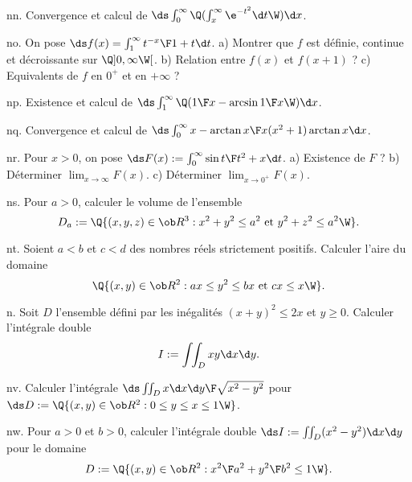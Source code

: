 \exo [Level=2,Fight=1,Learn=1,Type=\Exercices,Field=\IntégralesGénéralisées|\IntégralesMultiples,Origin=] nn. 
Convergence et calcul de $\ds \int_0^\infty\Q(\int_x^\infty\e^{-t^2}\d t\W)\d x$. 

\exo [Level=2,Fight=1,Learn=1,Type=\Exercices,Field=\FonctionsDéfiniesParUneIntégrale,Origin=] no. 
On pose $\ds f(x)=\int_1^\infty{t^{-x}\F1+t}\d t$. \pn 
a) Montrer que $f$ est définie, continue et décroissante sur $\Q]0,\infty\W[$. \pn
b) Relation entre $f(x)$ et $f(x+1)$ ? \pn
c) Equivalents de $f$ en $0^+$ et en $+\infty$ ? 

\exo [Level=2,Fight=1,Learn=1,Type=\Exercices,Field=\IntégralesGénéralisées,Origin=] np. 
Existence et calcul de $\ds\int_1^\infty\Q({1\F x}-\arcsin{1\F x}\W)\d x$. 

\exo [Level=2,Fight=1,Learn=1,Type=\Exercices,Field=\IntégralesGénéralisées,Origin=] nq. 
Convergence et calcul de $\ds\int_0^\infty{x-\arctan x\F x(x^2+1)\arctan x}\d x$. 

\exo [Level=2,Fight=1,Learn=1,Type=\Exercices,Field=\FonctionsDéfiniesParUneIntégrale,Origin=] nr. 
Pour $x>0$, on pose $\ds F(x):=\int_0^\infty{\sin t\F t^2+x}\d t$. \pn
a) Existence de $F$ ? \pn
b) Déterminer $\lim_{x\to\infty}F(x)$. \pn
c) Déterminer $\lim_{x\to0^+}F(x)$.  

\exo [Level=2,Fight=1,Learn=1,Type=\Exercices,Field=\Volumes,Origin=] ns. 
Pour $a>0$, calculer le volume de l'ensemble 
$$
D_a:=\Q\{(x,y,z)\in\ob R^3:x^2+y^2\le a^2
\hbox{ et }y^2+z^2\le a^2\W\}. 
$$ 

\exo [Level=2,Fight=1,Learn=1,Type=\Exercices,Field=\Aires,Origin=] nt. 
Soient $a<b$ et $c<d$ des nombres réels strictement positifs. 
Calculer l'aire du domaine 
$$
\Q\{(x,y)\in\ob R^2:ax\le y^2\le bx\hbox{ et }cx\le x\W\}.
$$ 

\exo [Level=2,Fight=0,Learn=0,Type=\Exercices,Field=\IntégralesMultiples,Origin=] n. 
Soit $D$ l'ensemble défini par les inégalités $(x+y)^2\le 2x$ et $y\ge0$. 
Calculer l'intégrale double 
$$
I:=\int\!\!\int_Dxy\d x\d y. 
$$

\exo [Level=2,Fight=1,Learn=1,Type=\Exercices,Field=\IntégralesMultiples,Origin=] nv. 
Calculer l'intégrale $\ds \int\!\!\int_D{x\d x\d y\F\sqrt{x^2-y^2}}$ 
pour $\ds D:=\Q\{(x,y)\in\ob R^2:0\le y\le x\le 1\W\}$.  

\exo [Level=2,Fight=1,Learn=1,Type=\Exercices,Field=\IntégralesMultiples,Origin=] nw. 
Pour $a>0$ et $b>0$, calculer l'intégrale double $\ds I:=\int\!\!\int_D(x^2-y^2)\d x\d y$ 
pour le domaine  
$$
D:=\Q\{(x,y)\in\ob R^2:{x^2\F a^2}+{y^2\F b^2}\le 1\W\}.
$$ 
 
